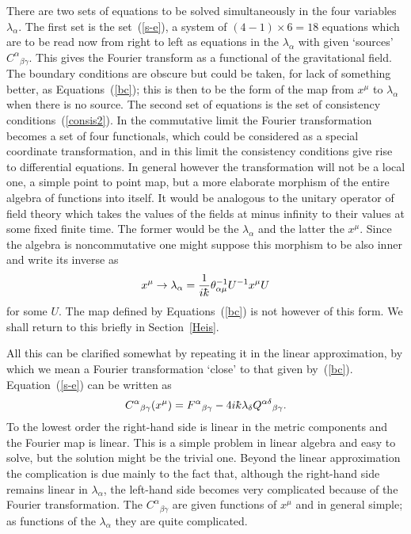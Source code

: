 \documentclass[12pt,a4paper]{article}
\def\kbar{{\mathchar'26\mkern-9muk}}
\begin{document}
There are two sets of equations to be solved simultaneously in the
four variables $\lambda_\alpha$. The first set is the
set~(\ref{s-e}), a system of $(4-1)\times 6 = 18$ equations which are
to be read now from right to left as equations in the $\lambda_\alpha$
with given `sources' $C^\alpha{}_{\beta\gamma}$. This gives the
Fourier transform as a functional of the gravitational field. The
boundary conditions are obscure but could be taken, for lack of
something better, as Equations~(\ref{bc}); this is then to be the form of
the map from $x^\mu$ to $\lambda_\alpha$ when there is no source.
The second set of equations is the set of consistency
conditions~(\ref{consis2}). In the commutative limit the Fourier
transformation becomes a set of four functionals, which could be considered
as a special coordinate transformation, and in this limit the
consistency conditions give rise to differential equations. In general
however the transformation will not be a local one, a simple point to
point map, but a more elaborate morphism of the entire algebra of
functions into itself. It would be analogous to the unitary operator
of field theory which takes the values of the fields at minus infinity
to their values at some fixed finite time. The former would be the
$\lambda_\alpha$ and the latter the $x^\mu$. Since the algebra is
noncommutative one might suppose this morphism to be also inner and
write its inverse as
$$
x^\mu \rightarrow \lambda_\alpha =
\frac{1}{i\kbar} \theta^{-1}_{\alpha\mu} U^{-1} x^\mu U 
$$
for some $U$. The map defined by Equations~(\ref{bc}) is not however
of this form. We shall return to this briefly in Section~\ref{Heis}.

All this can be clarified somewhat by repeating it in the linear
approximation, by which we mean a Fourier transformation `close' to
that given by~(\ref{bc}). Equation~(\ref{s-e}) can be written as
$$
C^\alpha{}_{\beta\gamma}(x^\mu) = F^\alpha{}_{\beta\gamma} -
4i\kbar\lambda_\delta Q^{\alpha\delta}{}_{\beta\gamma}.
$$
To the lowest order the right-hand side is linear in the metric
components and the Fourier map is linear. This is a simple problem in
linear algebra and easy to solve, but the solution might be the
trivial one. Beyond the linear approximation the complication is due
mainly to the fact that, although the right-hand side remains linear
in $\lambda_\alpha$, the left-hand side becomes very complicated
because of the Fourier transformation. The $C^\alpha{}_{\beta\gamma}$
are given functions of $x^\mu$ and in general simple; as functions of
the $\lambda_\alpha$ they are quite complicated.
\end{document}
